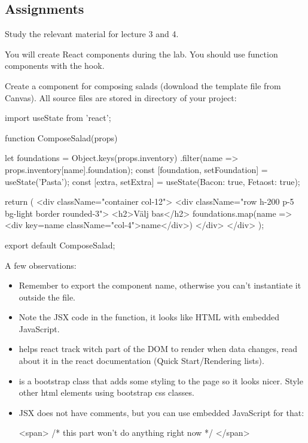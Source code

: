 \documentclass[fleqn, article, a4paper]{memoir}
\begin{document}
\subsection*{Assignments}

\begin{Assignments}

\item Study the relevant material for lecture 3 and 4.

\item You will create React components during the lab. You should use function components with the  hook.

\item Create a component for composing salads (download the template file from Canvas). All source files are stored in  directory of your project:
\begin{Code}
import { useState } from 'react';

function ComposeSalad(props) {
  let foundations = Object.keys(props.inventory)
                    .filter(name => props.inventory[name].foundation);
  const [foundation, setFoundation] = useState('Pasta'); 
  const [extra, setExtra] = useState({Bacon: true, Fetaost: true}); 

  return (
    <div className="container col-12">
      <div className="row h-200 p-5 bg-light border rounded-3">
        <h2>Välj bas</h2>
        {foundations.map(name => <div key={name} className="col-4">{name}</div>)}
      </div>
    </div>
  );
}
export default ComposeSalad;\end{Code}

\noindent A few observations:
\begin{itemize}
  \item Remember to export the component name, otherwise you can't instantiate it outside the file.
  \item Note the JSX code in the function, it looks like HTML with embedded JavaScript.
   \item {} helps react track witch part of the DOM to render when data changes, read about it in the react documentation (Quick Start/Rendering lists).
   \item {} is a bootstrap class that adds some styling to the page so it looks nicer. Style other html elements using bootstrap css classes.
   \item JSX does not have comments, but you can use embedded JavaScript for that:
\begin{Code}
<span>  {/* this part won't do anything right now */}  </span>
\end{Code}
\end{itemize}


\end{Assignments}
\end{document}
